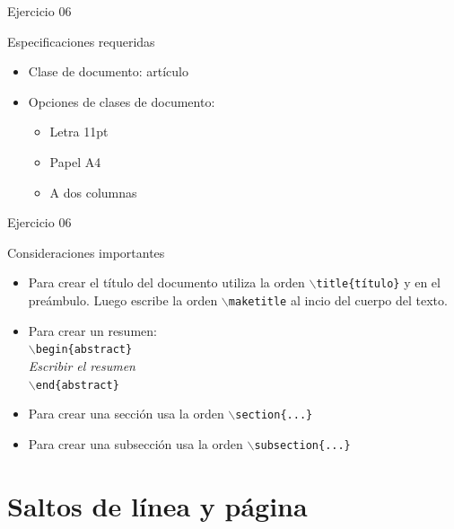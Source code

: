\begin{frame}{Ejercicio 06}
    \begin{exampleblock}{Especificaciones requeridas}
        \begin{itemize}
            \item Clase de documento: art\'iculo
            \item Opciones de clases de documento: 
                \begin{itemize}
                    \item Letra 11pt
                    \item Papel A4
                    \item A dos columnas
                \end{itemize}
        \end{itemize}
    \end{exampleblock}

\end{frame}

\begin{frame}{Ejercicio 06}
    \begin{exampleblock}{Consideraciones importantes}
        \begin{itemize}
            \item Para crear el título del documento utiliza la orden \texttt{$\backslash$title\{t\'itulo\}} y en el pre\'ambulo.
                Luego escribe la orden \texttt{$\backslash$maketitle} al incio del cuerpo del texto.
            \item Para crear un resumen:\\
                \texttt{$\backslash$begin\{abstract\}} \\
                \textit{Escribir el resumen} \\
                \texttt{$\backslash$end\{abstract\}}
            \item Para crear una secci\'on usa la orden \texttt{$\backslash$section\{...\}}
            \item Para crear una subsecci\'on usa la orden \texttt{$\backslash$subsection\{...\}}
        \end{itemize}
    \end{exampleblock}
\end{frame}

\section{Saltos de l\'inea y p\'agina}

